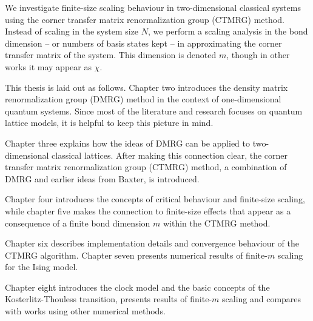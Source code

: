 We investigate finite-size scaling behaviour in two-dimensional classical systems using
the corner transfer matrix renormalization group (CTMRG) method. Instead of scaling in the
system size $N$, we perform a scaling analysis in the bond dimension -- or numbers of
basis states kept -- in approximating the corner transfer matrix of the system. This
dimension is denoted $m$, though in other works it may appear as $\chi$.

This thesis is laid out as follows. Chapter two introduces the density matrix
renormalization group (DMRG) method in the context of one-dimensional quantum systems.
Since most of the literature and research focuses on quantum lattice models, it is helpful
to keep this picture in mind.

Chapter three explains how the ideas of DMRG can be applied to two-dimensional classical
lattices. After making this connection clear, the corner transfer matrix
renormalization group (CTMRG) method, a combination of DMRG and earlier ideas from Baxter, is introduced.

Chapter four introduces the concepts of critical behaviour and finite-size scaling,
while chapter five makes the connection to finite-size effects that appear as a consequence of a finite bond dimension
$m$ within the CTMRG method.

Chapter six describes implementation details and convergence behaviour of the CTMRG algorithm.
Chapter seven presents numerical results of finite-$m$ scaling for the Ising model.

Chapter eight introduces the clock model and the basic concepts of the Kosterlitz-Thouless transition,
presents results of finite-$m$ scaling and compares with works using other numerical methods.
